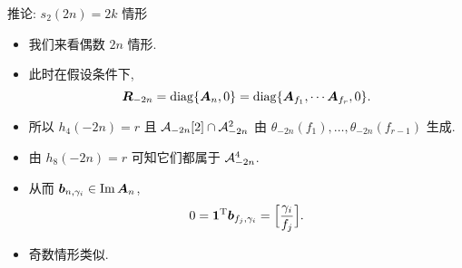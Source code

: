 \documentclass[aspectratio=169]{ctexbeamer}
\renewcommand\aleg[2]{\Bigl[\dfrac{{#1}}{#2}\Bigr]}
\begin{document}
\begin{frame}{推论: $s_2(2n)=2k$ 情形}
	\begin{itemize}
		\item 我们来看偶数 $2n$ 情形.
		\item 此时在假设条件下,
		\[
			{\boldsymbol{R}}_{-2n}={\mathrm{diag}}\{{\boldsymbol{A}}_n,0\}
			={\mathrm{diag}}\{{\boldsymbol{A}}_{f_1},\cdots {\boldsymbol{A}}_{f_r},0\}.
		\]
		\item 所以 $h_4(-2n)=r$ 且 ${\mathcal{A}}_{-2n}[2]\cap {\mathcal{A}}_{-2n}^2$ 由 $\theta_{-2n}(f_1),\dots,\theta_{-2n}(f_{r-1})$ 生成.
		\item 由 $h_8(-2n)=r$ 可知它们都属于 ${\mathcal{A}}_{-2n}^4$.
		\item 从而 ${\boldsymbol{b}}_{n,\gamma_i}\in\operatorname{Im} {\boldsymbol{A}}_n$, 
		\[
			0={\bf1}^\rmT\bfb_{f_j,\gamma_i}=\aleg{\gamma_i}{f_j}.
		\]
		\item 奇数情形类似.
	\end{itemize}
\end{frame}
\end{document}

